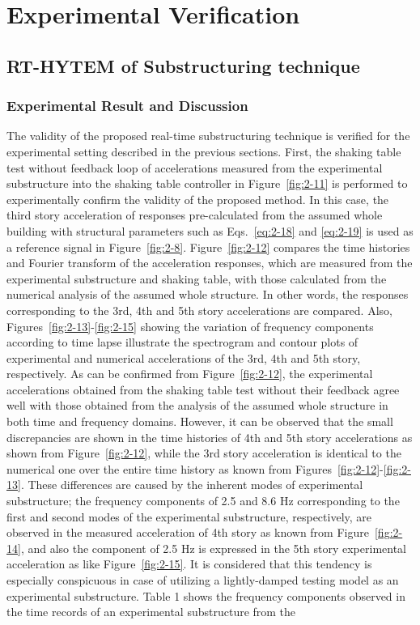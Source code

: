 \chapter{Experimental Verification}
\section{RT-HYTEM of Substructuring technique}
\subsection{Experimental Result and Discussion}
The validity of the proposed real-time substructuring technique is verified for the experimental setting described in the previous sections. First, the shaking table test without feedback loop of accelerations measured from the experimental substructure into the shaking table controller in Figure~\ref{fig:2-11} is performed to experimentally confirm the validity of the proposed method. In this case, the third story acceleration of responses pre-calculated from the assumed whole building with structural parameters such as Eqs.~\eqref{eq:2-18} and \eqref{eq:2-19} is used as a reference signal in Figure~\ref{fig:2-8}. Figure~\ref{fig:2-12} compares the time histories and Fourier transform of the acceleration responses, which are measured from the experimental substructure and shaking table, with those calculated from the numerical analysis of the assumed whole structure. In other words, the responses corresponding to the 3rd, 4th and 5th story accelerations are compared. Also, Figures~\ref{fig:2-13}-\ref{fig:2-15} showing the variation of frequency components according to time lapse illustrate the spectrogram and contour plots of experimental and numerical accelerations of the 3rd, 4th and 5th story, respectively. As can be confirmed from Figure~\ref{fig:2-12}, the experimental accelerations obtained from the shaking table test without their feedback agree well with those obtained from the analysis of the assumed whole structure in both time and frequency domains. However, it can be observed that the small discrepancies are shown in the time histories of 4th and 5th story accelerations as shown from Figure~\ref{fig:2-12}, while the 3rd story acceleration is identical to the numerical one over the entire time history as known from Figures~\ref{fig:2-12}-\ref{fig:2-13}. These differences are caused by the inherent modes of experimental substructure; the frequency components of 2.5 and 8.6 Hz corresponding to the first and second modes of the experimental substructure, respectively, are observed in the measured acceleration of 4th story as known from Figure~\ref{fig:2-14}, and also the component of 2.5 Hz is expressed in the 5th story experimental acceleration as like Figure~\ref{fig:2-15}. It is considered that this tendency is especially conspicuous in case of utilizing a lightly-damped testing model as an experimental substructure. Table 1 shows the frequency components observed in the time records of an experimental substructure from the 